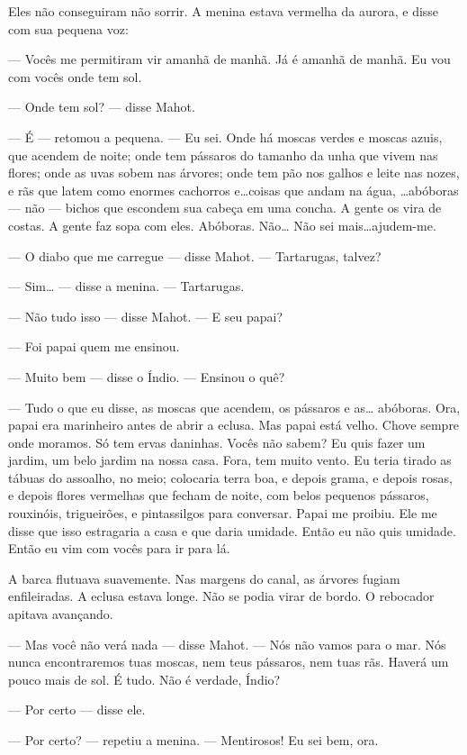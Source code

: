 Eles não conseguiram não sorrir. A menina estava vermelha da aurora, e
disse com sua pequena voz:

--- Vocês me permitiram vir amanhã de manhã. Já é amanhã de manhã. Eu
vou com vocês onde tem sol.

--- Onde tem sol? --- disse Mahot.

--- É --- retomou a pequena. --- Eu sei. Onde há moscas verdes e moscas azuis,
que acendem de noite; onde tem pássaros do tamanho da unha que vivem nas
flores; onde as uvas sobem nas árvores; onde tem pão nos galhos e leite
nas nozes, e rãs que latem como enormes cachorros e\ldots{}coisas que andam na
água, \ldots{}abóboras --- não --- bichos que escondem sua cabeça em uma concha. A
gente os vira de costas. A gente faz sopa com eles. Abóboras. Não\ldots{} Não
sei mais\ldots{}ajudem-me.

--- O diabo que me carregue --- disse Mahot. --- Tartarugas, talvez?

--- Sim\ldots{} --- disse a menina. --- Tartarugas.

--- Não tudo isso --- disse Mahot. --- E seu papai?

--- Foi papai quem me ensinou.

--- Muito bem --- disse o Índio. --- Ensinou o quê?

--- Tudo o que eu disse, as moscas que acendem, os pássaros e as\ldots{}
abóboras. Ora, papai era marinheiro antes de abrir a eclusa. Mas papai
está velho. Chove sempre onde moramos. Só tem ervas daninhas. Vocês não
sabem? Eu quis fazer um jardim, um belo jardim na nossa casa. Fora, tem
muito vento. Eu teria tirado as tábuas do assoalho, no meio; colocaria
terra boa, e depois grama, e depois rosas, e depois flores vermelhas que
fecham de noite, com belos pequenos pássaros, rouxinóis, trigueirões, e
pintassilgos para conversar. Papai me proibiu. Ele me disse que isso
estragaria a casa e que daria umidade. Então eu não quis umidade. Então eu
vim com vocês para ir para lá.

A barca flutuava suavemente. Nas margens do canal, as árvores fugiam
enfileiradas. A eclusa estava longe. Não se podia virar de bordo. O
rebocador apitava avançando.

--- Mas você não verá nada --- disse Mahot. --- Nós não vamos para o mar. Nós
nunca encontraremos tuas moscas, nem teus pássaros, nem tuas rãs. Haverá
um pouco mais de sol. É tudo. Não é verdade, Índio?

--- Por certo --- disse ele.

--- Por certo? --- repetiu a menina.  --- Mentirosos! Eu sei bem, ora.

